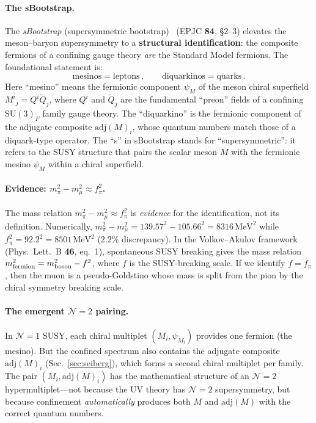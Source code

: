 \documentclass[12pt,a4paper]{article}
\newcommand{\SU}{\mathrm{SU}}
\newcommand{\adj}{\mathrm{adj}}
\newcommand{\MeV}{\,\mathrm{MeV}}
\begin{document}
\paragraph{The sBootstrap.}
The \emph{sBootstrap} (supersymmetric
bootstrap)~\cite{Rivero:2024epjc} (EPJC \textbf{84}, \S2--3)
elevates the meson--baryon supersymmetry to a
\textbf{structural identification}: the composite fermions of a
confining gauge theory \emph{are} the Standard Model fermions.
The foundational statement is:
\begin{equation}
  \boxed{
  \text{mesinos} = \text{leptons}\,,
  \qquad
  \text{diquarkinos} = \text{quarks}\,.}
  \label{eq:sbootstrap_def}
\end{equation}
Here ``mesino'' means the fermionic component $\psi_M$ of the
meson chiral superfield $M^i{}_j = Q^i\tilde{Q}_j$, where
$Q^i$ and $\tilde{Q}_j$ are the fundamental ``preon'' fields of
a confining $\SU(3)_F$ family gauge theory.
The ``diquarkino'' is the fermionic component of the adjugate
composite $\adj(M)_i$, whose quantum numbers match those of a
diquark-type operator.
The ``s'' in sBootstrap stands for ``supersymmetric'':
it refers to the SUSY structure that pairs the scalar meson
$M$ with the fermionic mesino $\psi_M$ within a chiral
superfield.

\paragraph{Evidence: $m_\pi^2 - m_\mu^2 \approx f_\pi^2$.}
The mass relation $m_\pi^2 - m_\mu^2 \approx f_\pi^2$
is \emph{evidence} for the identification, not its definition.
Numerically, $m_\pi^2 - m_\mu^2 = 139.57^2 - 105.66^2 =
8316\MeV^2$ while $f_\pi^2 = 92.2^2 = 8501\MeV^2$ ($2.2\%$
discrepancy).
In the Volkov--Akulov framework~\cite{VolkovAkulov:1973}
(Phys.\ Lett.\ B \textbf{46}, eq.~1), spontaneous SUSY
breaking gives the mass relation
$m_{\rm fermion}^2 = m_{\rm boson}^2 - f^2$, where $f$ is the
SUSY-breaking scale.
If we identify $f = f_\pi$, then the muon is a pseudo-Goldstino
whose mass is split from the pion by the chiral symmetry
breaking scale.

\paragraph{The emergent $\mathcal{N}{=}2$ pairing.}
In $\mathcal{N}{=}1$ SUSY, each chiral multiplet
$(M_i, \psi_{M_i})$ provides one fermion (the mesino).
But the confined spectrum also contains the adjugate composite
$\adj(M)_i$ (Sec.~\ref{sec:seiberg}), which forms a second
chiral multiplet per family.
The pair $(M_i, \adj(M)_i)$ has the mathematical structure of an
$\mathcal{N}{=}2$ hypermultiplet---not because the UV theory has
$\mathcal{N}{=}2$ supersymmetry, but because confinement
\emph{automatically} produces both $M$ and $\adj(M)$ with the
correct quantum numbers.
\end{document}
